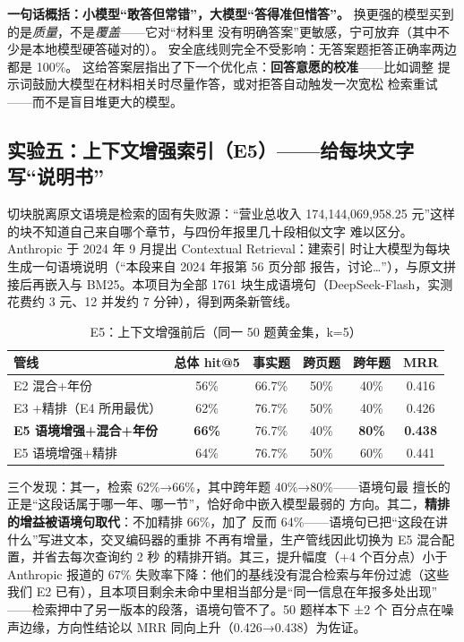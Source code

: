\documentclass[UTF8,11pt]{ctexart}
\begin{document}
\textbf{一句话概括：小模型``敢答但常错''，大模型``答得准但惜答''。}
换更强的模型买到的是\emph{质量}，不是\emph{覆盖}——它对``材料里
没有明确答案''更敏感，宁可放弃（其中不少是本地模型硬答碰对的）。
安全底线则完全不受影响：无答案题拒答正确率两边都是 100\%。
这给答案层指出了下一个优化点：\textbf{回答意愿的校准}——比如调整
提示词鼓励大模型在材料相关时尽量作答，或对拒答自动触发一次宽松
检索重试——而不是盲目堆更大的模型。

\subsection{实验五：上下文增强索引（E5）——给每块文字写``说明书''}

切块脱离原文语境是检索的固有失败源：``营业总收入 174,144,069,958.25
元''这样的块不知道自己来自哪个章节，与四份年报里几十段相似文字
难以区分。Anthropic 于 2024 年 9 月提出 Contextual Retrieval：建索引
时让大模型为每块生成一句语境说明（``本段来自 2024 年报第 56 页分部
报告，讨论\ldots''），与原文拼接后再嵌入与 BM25。本项目为全部
1761 块生成语境句（DeepSeek-Flash，实测花费约 3 元、12 并发约
7 分钟），得到两条新管线。

\begin{table}[H]
\centering
\begin{tabular}{lccccc}
\toprule
管线 & 总体 hit@5 & 事实题 & 跨页题 & 跨年题 & MRR \\
\midrule
E2 混合+年份 & 56\% & 66.7\% & 50\% & 40\% & 0.416 \\
E3 +精排（E4 所用最优） & 62\% & 76.7\% & 50\% & 40\% & 0.426 \\
\textbf{E5 语境增强+混合+年份} & \textbf{66\%} & 76.7\% & 40\% & \textbf{80\%} & \textbf{0.438} \\
E5 语境增强+精排 & 64\% & 76.7\% & 50\% & 60\% & 0.441 \\
\bottomrule
\end{tabular}
\caption{E5：上下文增强前后（同一 50 题黄金集，k=5）}
\label{tab:e5}
\end{table}

三个发现：其一，检索 62\%→66\%，其中跨年题 40\%→80\%——语境句最
擅长的正是``这段话属于哪一年、哪一节''，恰好命中嵌入模型最弱的
方向。其二，\textbf{精排的增益被语境句取代}：不加精排 66\%，加了
反而 64\%——语境句已把``这段在讲什么''写进文本，交叉编码器的重排
不再有增量，生产管线因此切换为 E5 混合配置，并省去每次查询约 2 秒
的精排开销。其三，提升幅度（+4 个百分点）小于 Anthropic 报道的
67\% 失败率下降：他们的基线没有混合检索与年份过滤（这些我们 E2
已有），且本项目剩余未命中里相当部分是``同一信息在年报多处出现''
——检索押中了另一版本的段落，语境句管不了。50 题样本下 ±2 个
百分点在噪声边缘，方向性结论以 MRR 同向上升（0.426→0.438）为佐证。
\end{document}
